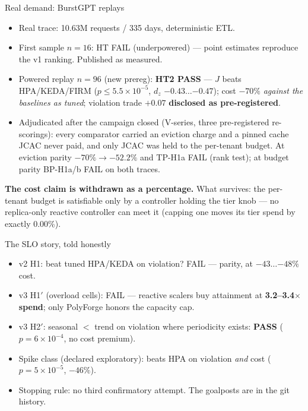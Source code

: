 \documentclass[aspectratio=169,11pt]{beamer}
\newcommand{\dz}{d_z}
\begin{document}
\begin{frame}{Real demand: BurstGPT replays}
  \begin{itemize}
    \item Real trace: 10.63M requests / 335 days, deterministic ETL.
    \item First sample $n{=}16$: \alert{HT FAIL} (underpowered) --- point
          estimates reproduce the v1 ranking. Published as measured.
    \item Powered replay $n{=}96$ (new prereg): \textbf{HT2 PASS} ---
          $J$ beats HPA/KEDA/FIRM ($p \le 5.5{\times}10^{-5}$,
          $\dz$ $-0.43\ldots{-0.47}$); cost $-70\%$ \emph{against the
          baselines as tuned}; violation trade $+0.07$ \textbf{disclosed as
          pre-registered}.
    \item \alert{Adjudicated after the campaign closed} (V-series, three
          pre-registered re-scorings): every comparator carried an eviction
          charge and a pinned cache JCAC never paid, and only JCAC was
          held to the per-tenant budget. At eviction parity $-70\%
          \to -52.2\%$ and \alert{TP-H1a FAIL} (rank test); at budget
          parity \alert{BP-H1a/b FAIL} on both traces.
  \end{itemize}
  \vfill
  \small \textbf{The cost claim is withdrawn as a percentage.} What
  survives: the per-tenant budget is satisfiable only by a controller
  holding the tier knob --- no replica-only reactive controller can meet it
  (capping one moves its tier spend by exactly 0.00\%).
\end{frame}

\begin{frame}{The SLO story, told honestly}
  \begin{itemize}
    \item v2 H1: beat tuned HPA/KEDA on violation? \alert{FAIL} --- parity,
          at $-43\ldots{-48\%}$ cost.
    \item v3 H1$'$ (overload cells): \alert{FAIL} --- reactive scalers buy
          attainment at \textbf{3.2--3.4$\times$ spend}; only PolyForge
          honors the capacity cap.
    \item v3 H2$'$: seasonal $<$ trend on violation where periodicity
          exists: \textbf{PASS} ($p=6{\times}10^{-4}$, no cost premium).
    \item Spike class (declared exploratory): beats HPA on violation
          \emph{and} cost ($p=5{\times}10^{-5}$, $-46\%$).
    \item Stopping rule: no third confirmatory attempt. The goalposts are in
          the git history.
  \end{itemize}
\end{frame}
\end{document}
